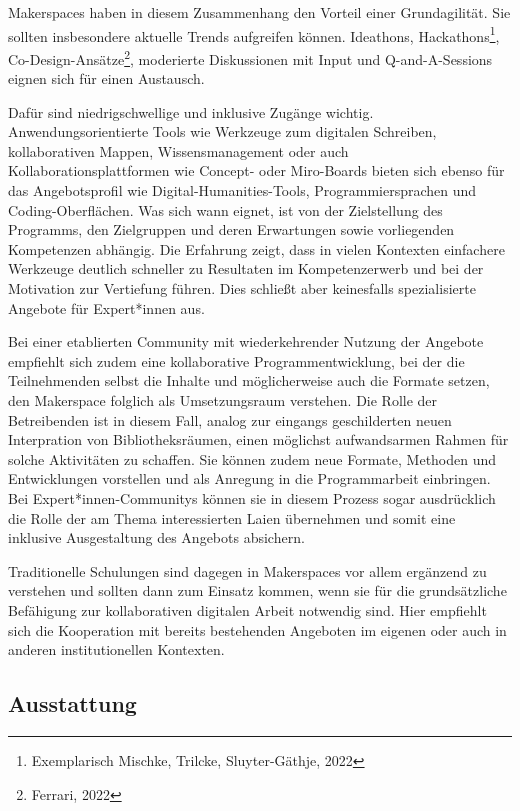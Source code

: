 \documentclass[a4paper,
fontsize=11pt,
oneside,
numbers=noperiodatend,
parskip=half-,
bibliography=totoc,
final
]{scrartcl}
\begin{document}
Makerspaces haben in diesem Zusammenhang den Vorteil einer
Grundagilität. Sie sollten insbesondere aktuelle Trends aufgreifen
können. Ideathons, Hackathons\footnote{Exemplarisch Mischke, Trilcke,
  Sluyter-Gäthje, 2022}, Co-Design-Ansätze\footnote{Ferrari, 2022},
moderierte Diskussionen mit Input und Q-and-A-Sessions eignen sich für
einen Austausch.

Dafür sind niedrigschwellige und inklusive Zugänge wichtig.
Anwendungsorientierte Tools wie Werkzeuge zum digitalen Schreiben,
kollaborativen Mappen, Wissensmanagement oder auch
Kollaborationsplattformen wie Concept- oder Miro-Boards bieten sich
ebenso für das Angebotsprofil wie Digital-Humanities-Tools,
Programmiersprachen und Coding-Oberflächen. Was sich wann eignet, ist
von der Zielstellung des Programms, den Zielgruppen und deren
Erwartungen sowie vorliegenden Kompetenzen abhängig. Die Erfahrung
zeigt, dass in vielen Kontexten einfachere Werkzeuge deutlich schneller
zu Resultaten im Kompetenzerwerb und bei der Motivation zur Vertiefung
führen. Dies schließt aber keinesfalls spezialisierte Angebote für
Expert*innen aus.

Bei einer etablierten Community mit wiederkehrender Nutzung der Angebote
empfiehlt sich zudem eine kollaborative Programmentwicklung, bei der die
Teilnehmenden selbst die Inhalte und möglicherweise auch die Formate
setzen, den Makerspace folglich als Umsetzungsraum verstehen. Die Rolle
der Betreibenden ist in diesem Fall, analog zur eingangs geschilderten
neuen Interpration von Bibliotheksräumen, einen möglichst aufwandsarmen
Rahmen für solche Aktivitäten zu schaffen. Sie können zudem neue
Formate, Methoden und Entwicklungen vorstellen und als Anregung in die
Programmarbeit einbringen. Bei Expert*innen-Communitys können sie in
diesem Prozess sogar ausdrücklich die Rolle der am Thema interessierten
Laien übernehmen und somit eine inklusive Ausgestaltung des Angebots
absichern.

Traditionelle Schulungen sind dagegen in Makerspaces vor allem ergänzend
zu verstehen und sollten dann zum Einsatz kommen, wenn sie für die
grundsätzliche Befähigung zur kollaborativen digitalen Arbeit notwendig
sind. Hier empfiehlt sich die Kooperation mit bereits bestehenden
Angeboten im eigenen oder auch in anderen institutionellen Kontexten.

\hypertarget{ausstattung}{%
\subsection{Ausstattung}\label{ausstattung}}
\end{document}

